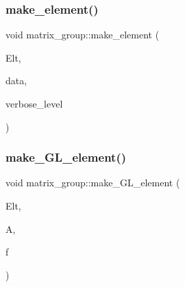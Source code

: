 \subsubsection{\texorpdfstring{make\+\_\+element()}{make\_element()}}
{\footnotesize\ttfamily void matrix\+\_\+group\+::make\+\_\+element (\begin{DoxyParamCaption}\item[{\mbox{\hyperlink{galois_8h_a09fddde158a3a20bd2dcadb609de11dc}{I\+NT}} $\ast$}]{Elt,  }\item[{\mbox{\hyperlink{galois_8h_a09fddde158a3a20bd2dcadb609de11dc}{I\+NT}} $\ast$}]{data,  }\item[{\mbox{\hyperlink{galois_8h_a09fddde158a3a20bd2dcadb609de11dc}{I\+NT}}}]{verbose\+\_\+level }\end{DoxyParamCaption})}

\mbox{\label{classmatrix__group_ab60cc02d4fb6b9c8f4e20bf8248966a5}} 
\subsubsection{\texorpdfstring{make\+\_\+\+G\+L\+\_\+element()}{make\_GL\_element()}}
{\footnotesize\ttfamily void matrix\+\_\+group\+::make\+\_\+\+G\+L\+\_\+element (\begin{DoxyParamCaption}\item[{\mbox{\hyperlink{galois_8h_a09fddde158a3a20bd2dcadb609de11dc}{I\+NT}} $\ast$}]{Elt,  }\item[{\mbox{\hyperlink{galois_8h_a09fddde158a3a20bd2dcadb609de11dc}{I\+NT}} $\ast$}]{A,  }\item[{\mbox{\hyperlink{galois_8h_a09fddde158a3a20bd2dcadb609de11dc}{I\+NT}}}]{f }\end{DoxyParamCaption})}

\mbox{\label{classmatrix__group_aaa152420f958c5cf15d0fdce9f10a39b}} 
